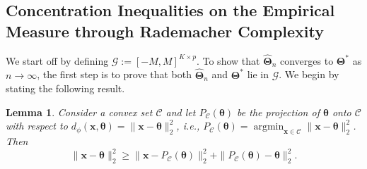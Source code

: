\documentclass[11pt]{article}
\newtheorem{lemma}{Lemma}[section]
\begin{document}



\subsection{Concentration Inequalities on the Empirical Measure through Rademacher Complexity}

We start off by defining $\mathscr{G} := [-M,M]^{K \times p}$. To show that $\displaystyle \widehat{\bm{\Theta}}_n$ converges to $\bm{\Theta}^*$ as $n \to \infty$, the first step is to prove that both $\widehat{\bm{\Theta}}_n$ and $\displaystyle \bm{\Theta}^*$ lie in $\mathscr{G}$. We begin by stating the following result.


\begin{lemma}\label{lemma-1-obtuse}
    Consider a convex set $\mathcal{C}$ and let $P_{\mathcal{C}}(\bm{\theta})$ be the projection of $\bm{\theta}$ onto $\mathcal{C}$ with respect to $d_{\phi}(\bm{x},\bm{\theta})=\|\bm{x}-\bm{\theta}\|_2^2$, i.e., $P_\mathcal{C}(\bm{\theta})=\operatorname{argmin}_{\bm{x}\in \mathcal{C}}\|\bm{x}-\bm{\theta}\|_2^2$. Then \[\|\bm{x}-\bm{\theta}\|_2^2\ge \|\bm{x}-P_{\mathcal{C}}(\bm{\theta})\|_2^2+\|P_{\mathcal{C}}(\bm{\theta})-\bm{\theta}\|_2^2.\]
\end{lemma}
\end{document}
